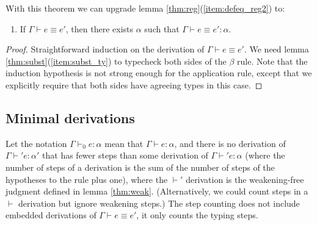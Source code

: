 With this theorem we can upgrade lemma \ref{thm:reg}(\ref{item:defeq_reg2}) to:
\begin{lemma}
\begin{enumerate}
\item If $\Gamma\vdash e\equiv e'$, then there exists $\alpha$ such that $\Gamma\vdash e\equiv e':\alpha$.
\end{enumerate}
\end{lemma}
\begin{proof}
Straightforward induction on the derivation of $\Gamma\vdash e\equiv e'$. We need lemma \ref{thm:subst}(\ref{item:subst_ty}) to typecheck both sides of the $\beta$ rule. Note that the induction hypothesis is not strong enough for the application rule, except that we explicitly require that both sides have agreeing types in this case.
\end{proof}

\subsection{Minimal derivations}
Let the notation $\Gamma\vdash_0e:\alpha$ mean that $\Gamma\vdash e:\alpha$, and there is no derivation of  $\Gamma\vdash' e:\alpha'$ that has fewer steps than some derivation of $\Gamma\vdash' e:\alpha$ (where the number of steps of a derivation is the sum of the number of steps of the hypotheses to the rule plus one), where the $\vdash'$ derivation is the weakening-free judgment defined in lemma \ref{thm:weak}. (Alternatively, we could count steps in a $\vdash$ derivation but ignore weakening steps.) The step counting does not include embedded derivations of $\Gamma\vdash e\equiv e'$, it only counts the typing steps.

